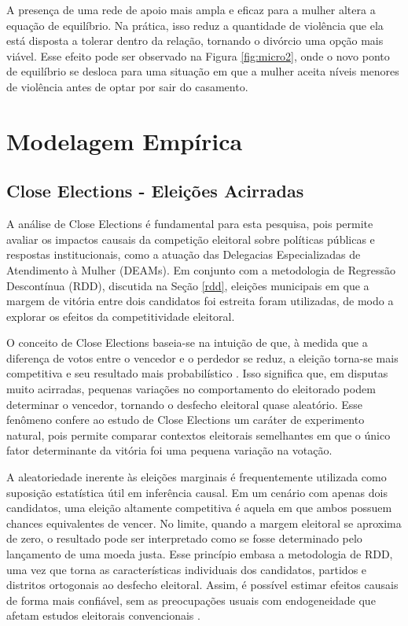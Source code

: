A presença de uma rede de apoio mais ampla e eficaz para a mulher altera a equação de equilíbrio. Na prática, isso reduz a quantidade de violência que ela está disposta a tolerar dentro da relação, tornando o divórcio uma opção mais viável. Esse efeito pode ser observado na Figura \ref{fig:micro2}, onde o novo ponto de equilíbrio se desloca para uma situação em que a mulher aceita níveis menores de violência antes de optar por sair do casamento.

\section{Modelagem Empírica}
\label{modelagem_empirica}



\subsection{Close Elections - Eleições Acirradas}
\label{close_elections}

A análise de Close Elections é fundamental para esta pesquisa, pois permite avaliar os impactos causais da competição eleitoral sobre políticas públicas e respostas institucionais, como a atuação das Delegacias Especializadas de Atendimento à Mulher (DEAMs). Em conjunto com a metodologia de Regressão Descontínua (RDD), discutida na Seção \ref{rdd}, eleições municipais em que a margem de vitória entre dois candidatos foi estreita foram utilizadas, de modo a explorar os efeitos da competitividade eleitoral.

O conceito de Close Elections baseia-se na intuição de que, à medida que a diferença de votos entre o vencedor e o perdedor se reduz, a eleição torna-se mais competitiva e seu resultado mais probabilístico \cite{grimmer2011close}. Isso significa que, em disputas muito acirradas, pequenas variações no comportamento do eleitorado podem determinar o vencedor, tornando o desfecho eleitoral quase aleatório. Esse fenômeno confere ao estudo de Close Elections um caráter de experimento natural, pois permite comparar contextos eleitorais semelhantes em que o único fator determinante da vitória foi uma pequena variação na votação.

A aleatoriedade inerente às eleições marginais é frequentemente utilizada como suposição estatística útil em inferência causal. Em um cenário com apenas dois candidatos, uma eleição altamente competitiva é aquela em que ambos possuem chances equivalentes de vencer. No limite, quando a margem eleitoral se aproxima de zero, o resultado pode ser interpretado como se fosse determinado pelo lançamento de uma moeda justa. Esse princípio embasa a metodologia de RDD, uma vez que torna as características individuais dos candidatos, partidos e distritos ortogonais ao desfecho eleitoral. Assim, é possível estimar efeitos causais de forma mais confiável, sem as preocupações usuais com endogeneidade que afetam estudos eleitorais convencionais \cite{grimmer2011close}.

